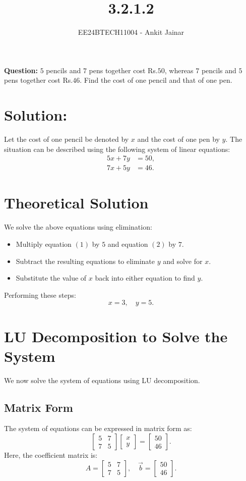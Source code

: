 \documentclass[journal]{IEEEtran}
\newcommand{\myvec}[1]{\begin{bmatrix}#1\end{bmatrix}}
\begin{document}
\title{3.2.1.2}
\author{EE24BTECH11004 - Ankit Jainar}
\maketitle

\textbf{Question:} \(5\) pencils and \(7\) pens together cost Rs.\(50\), whereas \(7\) pencils and \(5\) pens together cost Rs.\(46\). Find the cost of one pencil and that of one pen.\\

\section*{Solution:}
Let the cost of one pencil be denoted by \(x\) and the cost of one pen by \(y\).  
The situation can be described using the following system of linear equations:
\begin{align}
    5x + 7y &= 50, \tag{1} \\
    7x + 5y &= 46. \tag{2}
\end{align}

\section{Theoretical Solution}
We solve the above equations using elimination:
\begin{itemize}
    \item Multiply equation \((1)\) by \(5\) and equation \((2)\) by \(7\).
    \item Subtract the resulting equations to eliminate \(y\) and solve for \(x\).
    \item Substitute the value of \(x\) back into either equation to find \(y\).
\end{itemize}

Performing these steps:
\[
x = 3, \quad y = 5.
\]

\section{LU Decomposition to Solve the System}
We now solve the system of equations using LU decomposition.

\subsection{Matrix Form}
The system of equations can be expressed in matrix form as:
\begin{equation}
    \myvec{
    5 & 7 \\
    7 & 5
    } \myvec{x \\ y} = \myvec{50 \\ 46}.
\end{equation}
Here, the coefficient matrix is:
\begin{equation}
    A = \myvec
    {5 & 7 \\
    7 & 5}, \quad \vec{b} = \myvec{50 \\ 46}.
\end{equation}
\end{document}
